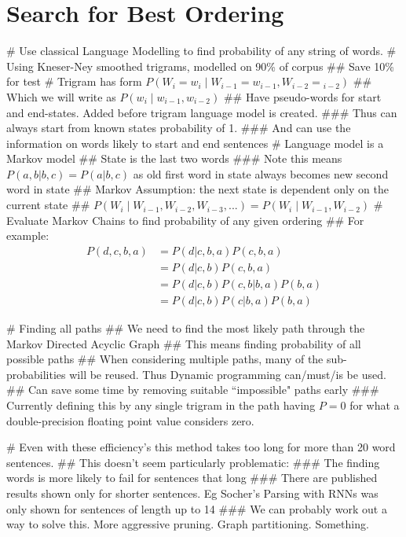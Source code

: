 \documentclass[]{scrartcl}
\begin{document}
\section{Search for Best Ordering}
\begin{easylist}[itemize]
	# Use classical Language Modelling to find probability of any string of words.
	# Using Kneser-Ney smoothed trigrams, modelled on 90\% of corpus
	## Save 10\% for test
	# Trigram has form $P(W_i\!=\!w_i \mid W_{i-1}\!=\!w_{i-1}, W_{i-2}\!=\!_{i-2})$
	## Which we will write as $P(w_i \mid w_{i-1}, w_{i-2})$
	## Have pseudo-words for start and end-states. Added before trigram language model is created.
	### Thus can always start from known states probability of 1.
	### And can use the information on words likely to start and end sentences
	# Language model is a Markov model
	## State is the last two words
	### Note this means $P(a,b|b,c)=P(a|b,c)$ as old first word in state always becomes new second word in state
	## Markov Assumption: the next state is dependent only on the current state
	##  $P(W_i \mid W_{i-1}, W_{i-2}, W_{i-3}, ...) = P(W_i \mid W_{i-1}, W_{i-2})$
	# Evaluate Markov Chains to find probability of any given ordering
	## For example:
	\begin{equation}
	\begin{split}
	P(d,c,b,a) &= P(d|c,b,a) P(c,b,a) \\
			   &= P(d|c,b) P(c,b,a) \\
			   &= P(d|c,b) P(c,b|b,a) P(b,a) \\
			   &=P(d|c,b) P(c|b,a) P(b,a)
	\end{split}
	\end{equation}
	
	# Finding all paths
	## We need to find the most likely path through the Markov Directed Acyclic Graph
	## This means finding probability of all possible paths
	## When considering multiple paths, many of the sub-probabilities will be reused. Thus Dynamic programming can/must/is be used.
	## Can save some time by removing suitable ``impossible" paths early
	### Currently defining this by any single trigram in the path having $P=0$ for what a double-precision floating point value considers zero.
	
	# Even with these efficiency's this method takes too long for more than 20 word sentences. 
	## This doesn't seem particularly problematic:
	### The finding words is more likely to fail for sentences that long
	### There are published results shown only for shorter sentences. Eg Socher's Parsing with RNNs was only shown for sentences of length up to 14
	### We can probably work out a way to solve this. More aggressive pruning. Graph partitioning. Something.

	
\end{easylist}
\end{document}
